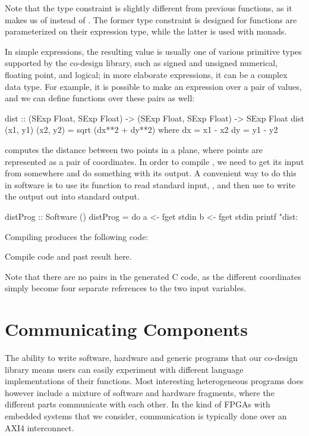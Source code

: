 \documentclass[../main.tex]{subfiles}
\begin{document}
\noindent Note that the type constraint is slightly different from previous functions, as it makes us of  instead of . The former type constraint is designed for functions are parameterized on their expression type, while the latter is used with monads.

In simple expressions, the resulting value is usually one of various primitive types supported by the co-design library, such as signed and unsigned numerical, floating point, and logical; in more elaborate expressions, it can be a complex data type. For example, it is possible to make an expression over a pair of values, and we can define functions over these pairs as well:

\begin{code}
dist :: (SExp Float, SExp Float) -> (SExp Float, SExp Float) -> SExp Float
dist (x1, y1) (x2, y2) = sqrt (dx**2 + dy**2)
  where
    dx = x1 - x2
    dy = y1 - y2
\end{code}

\noindent {} computes the distance between two points in a plane, where points are represented as a pair of coordinates. In order to compile , we need to get its input from somewhere and do something with its output. A convenient way to do this in software is to use its  function to read standard input, , and then use  to write the output out into standard output.

\begin{code}
distProg :: Software ()
distProg = do
  a <- fget stdin
  b <- fget stdin
  printf "dist: %
\end{code}

Compiling  produces the following code:

\begin{code}
Compile code and past result here.
\end{code}

\noindent Note that there are no pairs in the generated C code, as the different coordinates simply become four separate references to the two input variables.

\section{Communicating Components}

The ability to write software, hardware and generic programs that our co-design library means users can easily experiment with different language implementations of their functions. Most interesting heterogeneous programs does however include a mixture of software and hardware fragments, where the different parts communicate with each other. In the kind of FPGAs with embedded systems that we consider, communication is typically done over an AXI4 interconnect.
\end{document}
